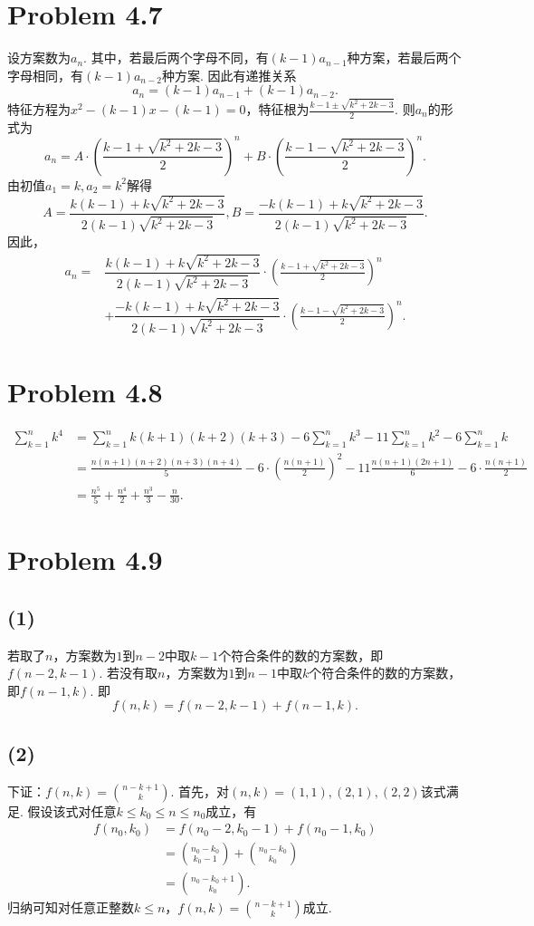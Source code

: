 \documentclass{article}
\begin{document}
\section*{Problem 4.7}
设方案数为$a_n$. 其中，若最后两个字母不同，有$(k-1)a_{n-1}$种方案，若最后两个字母相同，有$(k-1)a_{n-2}$种方案. 因此有递推关系
\[a_n=(k-1)a_{n-1}+(k-1)a_{n-2}.\]
特征方程为$x^2-(k-1)x-(k-1)=0$，特征根为$\frac{k-1\pm \sqrt{k^2+2k-3}}{2}$. 则$a_n$的形式为
\[a_n=A\cdot \left(\frac{k-1+ \sqrt{k^2+2k-3}}{2}\right)^n+B\cdot  \left(\frac{k-1- \sqrt{k^2+2k-3}}{2}\right)^n.\]
由初值$a_1=k,a_2=k^2$解得
\[A=\dfrac{k(k-1)+k\sqrt{k^2+2k-3}}{2(k-1)\sqrt{k^2+2k-3}},B=\dfrac{-k(k-1)+k\sqrt{k^2+2k-3}}{2(k-1)\sqrt{k^2+2k-3}}.\]
因此，
\begin{align*}
    a_n=&\dfrac{k(k-1)+k\sqrt{k^2+2k-3}}{2(k-1)\sqrt{k^2+2k-3}}\cdot \left(\frac{k-1+ \sqrt{k^2+2k-3}}{2}\right)^n\\
    &+\dfrac{-k(k-1)+k\sqrt{k^2+2k-3}}{2(k-1)\sqrt{k^2+2k-3}}\cdot  \left(\frac{k-1- \sqrt{k^2+2k-3}}{2}\right)^n.
\end{align*}


\section*{Problem 4.8}
\begin{align*}
    \sum_{k=1}^n k^4&=\sum_{k=1}^n k(k+1)(k+2)(k+3)-6\sum_{k=1}^n k^3-11\sum_{k=1}^n k^2-6\sum_{k=1}^n k\\
    &=\frac{n(n+1)(n+2)(n+3)(n+4)}{5}-6\cdot\left(\frac{n(n+1)}{2}\right)^2-11\frac{n(n+1)(2n+1)}{6}-6\cdot\frac{n(n+1)}{2}\\
    &=\frac{n^5}{5}+\frac{n^4}{2}+\frac{n^3}{3}-\frac{n}{30}.
\end{align*}


\section*{Problem 4.9}
\subsection*{(1)}
若取了$n$，方案数为$1$到$n-2$中取$k-1$个符合条件的数的方案数，即$f(n-2,k-1)$. 若没有取$n$，方案数为$1$到$n-1$中取$k$个符合条件的数的方案数，即$f(n-1,k)$. 即
\[f(n,k)=f(n-2,k-1)+f(n-1,k).\]

\subsection*{(2)}
下证：$f(n,k)=\binom{n-k+1}{k}$. 首先，对$(n,k)=(1,1),(2,1),(2,2)$该式满足. 假设该式对任意$k\leq k_0\leq n\leq n_0$成立，有
\begin{align*}
    f(n_0,k_0)&=f(n_0-2,k_0-1)+f(n_0-1,k_0)\\
    &=\binom{n_0-k_0}{k_0-1}+\binom{n_0-k_0}{k_0}\\
    &=\binom{n_0-k_0+1}{k_0}.
\end{align*}
归纳可知对任意正整数$k\leq n$，$f(n,k)=\binom{n-k+1}{k}$成立.
\end{document}
